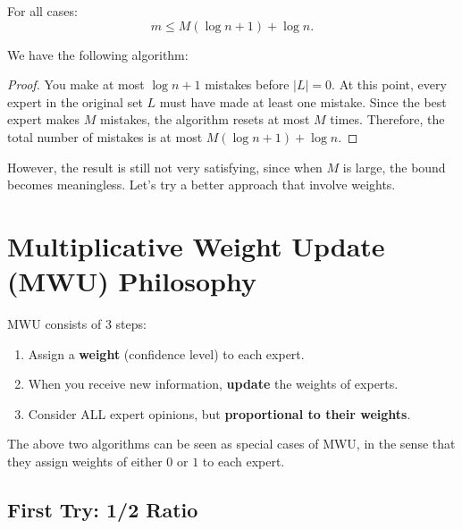 \begin{theorem}
  For all cases:
  \[ m\leq M(\log n + 1) + \log n. \]
\end{theorem}

\pagebreak

We have the following algorithm:
  \begin{algorithm}
      \caption{Resetting Expert Algorithm}
    \end{algorithm}

\begin{proof}
  You make at most $\log n + 1$ mistakes before $|L| = 0$. At this point, every expert in the original set $L$ must have made at least one mistake. Since the best expert makes $M$ mistakes, the algorithm resets at most $M$ times. Therefore, the total number of mistakes is at most $M(\log n + 1) + \log n$.
\end{proof}

However, the result is still not very satisfying, since when $M$ is large, the bound becomes meaningless. Let's try a better approach that involve weights.

\section{Multiplicative Weight Update (MWU) Philosophy}

\begin{definition}
MWU consists of 3 steps:
\begin{enumerate}
  \item Assign a \textbf{weight} (confidence level) to each expert.
  \item When you receive new information, \textbf{update} the weights of experts.
  \item Consider ALL expert opinions, but \textbf{proportional to their weights}.
  \end{enumerate}
\end{definition}
\begin{remark}
  The above two algorithms can be seen as special cases of MWU, in the sense that they assign weights of either $0$ or $1$ to each expert.
\end{remark}

\subsection{First Try: 1/2 Ratio}

